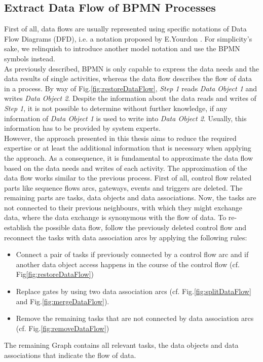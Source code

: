 \subsection{Extract Data Flow of BPMN Processes}
First of all, data flows are usually represented using specific notations of Data Flow Diagrams (DFD), i.e. a notation proposed by E.Yourdon \cite{YourdonDFD}. For simplicity's sake, we relinquish to introduce another model notation and use the BPMN symbols instead. \\
As previously described, BPMN is only capable to express the data needs and the data results of single activities, whereas the data flow describes the flow of data in a process. By way of Fig.\ref{fig:restoreDataFlow}, \textit{Step 1} reads \textit{Data Object 1} and writes \textit{Data Object 2}. Despite the information about the data reads and writes of \textit{Step 1}, it is not possible to determine without further knowledge, if any information of \textit{Data Object 1} is used to write into \textit{Data Object 2}. Usually, this information has to be provided by system experts. \\
However, the approach presented in this thesis aims to reduce the required expertise or at least the additional information that is necessary when applying the approach. 
As a consequence, it is fundamental to approximate the data flow based on the data needs and writes of each activity. The approximation of the data flow works similar to the previous process. First of all, control flow related parts like sequence flows arcs, gateways, events and triggers are deleted. The remaining parts are tasks, data objects and data associations. Now, the tasks are not connected to their previous neighbours, with which they might exchange data, where the data exchange is synonymous with the flow of data.
To re-establish the possible data flow, follow the previously deleted control flow and reconnect the tasks with data association arcs by applying the following rules:


\begin{itemize}
	\item Connect a pair of tasks if previously connected by a control flow arc and 
	if another data object access happens in the course of the control flow (cf. Fig\ref{fig:restoreDataFlow})
	\item Replace gates by using two data association arcs (cf. Fig.\ref{fig:splitDataFlow} and Fig.\ref{fig:mergeDataFlow}). 
	\item Remove the remaining tasks that are not connected by data association arcs (cf. Fig.\ref{fig:removeDataFlow})
	
\end{itemize}
The remaining Graph contains all relevant tasks, the data objects and data associations that indicate the flow of data.

